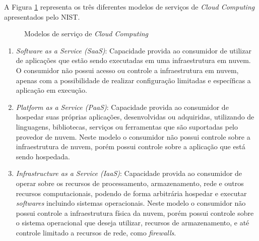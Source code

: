 A Figura \ref{fig:cloud-computing-services} representa os três
diferentes modelos de serviços de \emph{Cloud Computing} apresentados pelo NIST.

\begin{figure}[H]
    \caption{Modelos de serviço de \emph{Cloud Computing}}
    \centering
    \label{fig:cloud-computing-services}
\end{figure}

\begin{enumerate}
    \item \emph{Software as a Service (SaaS)}: Capacidade provida ao consumidor
          de utilizar de aplicações que estão sendo executadas em uma infraestrutura
          em nuvem. O consumidor não possui acesso ou controle a infraestrutura em nuvem,
          apenas com a possibilidade de realizar configuração limitadas e específicas
          a aplicação em execução.

    \item \emph{Platform as a Service (PaaS)}: Capacidade provida ao consumidor
          de hospedar suas próprias aplicações, desenvolvidas ou adquiridas, utilizando
          de linguagens, bibliotecas, serviços ou ferramentas que são suportadas pelo
          provedor de nuvem. Neste modelo o consumidor não possui controle sobre a infraestrutura
          de nuvem, porém possui controle sobre a aplicação que está sendo hospedada.

    \item \emph{Infrastructure as a Service (IaaS)}: Capacidade provida ao consumidor
          de operar sobre os recursos de processamento, armazenamento, rede e outros
          recursos computacionais, podendo de forma arbitrária hospedar e executar
          \emph{softwares} incluindo sistemas operacionais. Neste modelo o consumidor
          não possui controle a infraestrutura física da nuvem, porém possui controle
          sobre o sistema operacional que deseja utilizar, recursos de armazenamento,
          e até controle limitado a recursos de rede, como \emph{firewalls}.
\end{enumerate}

